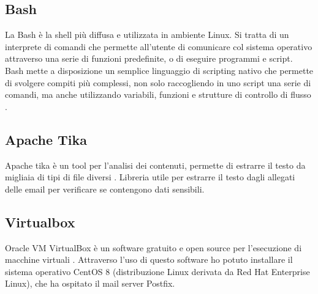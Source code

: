    
    \subsection{Bash}
    La Bash è la shell più diffusa e utilizzata in ambiente Linux. 
    Si tratta di un interprete di comandi che permette all'utente di comunicare col sistema operativo attraverso una
    serie di funzioni predefinite, o di eseguire programmi e script.
    Bash mette a disposizione un semplice linguaggio di scripting nativo che permette di svolgere compiti 
    più complessi, non solo raccogliendo in uno script una serie di comandi, 
    ma anche utilizzando variabili, funzioni e strutture di controllo di flusso \cite{Bash1}.
    
    \subsection{Apache Tika}
    Apache tika è un tool per l’analisi dei contenuti, permette di estrarre il testo da migliaia di tipi di file diversi \cite{tika}.
    Libreria utile per estrarre il testo dagli allegati delle email per verificare se contengono dati sensibili. 
    
    \subsection{Virtualbox}
    Oracle VM VirtualBox è un software gratuito e open source per l'esecuzione di macchine virtuali \cite{VirtualBox1}.
    Attraverso l’uso di questo software ho potuto installare il sistema operativo CentOS 8 
    (distribuzione Linux derivata da Red Hat Enterprise Linux), che ha ospitato il mail server Postfix.
